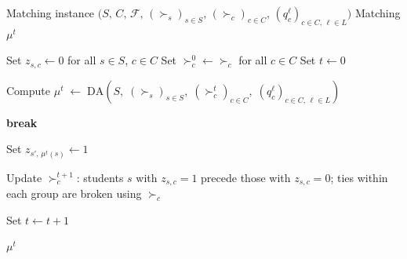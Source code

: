 \documentclass[12pt]{article}
\begin{document}
\bigskip

\begin{algorithm}[H]
    \caption{Simultaneous}
    \label{alg:simultaneous}
    \begin{algorithmic}[1]
        \REQUIRE Matching instance
        $\bigl(S,\,C,\,\mathcal{F},\,(\succ_s)_{s\in S},\,(\succ_c)_{c\in C},\,(q_c^\ell)_{c\in C,\,\ell\in L}\bigr)$
        \ENSURE Matching $\mu^t$

        \STATE Set $z_{s,c} \leftarrow 0$ for all $s\in S$, $c\in C$
        \STATE Set $\succ_c^{0} \leftarrow \succ_c$ for all $c\in C$
        \STATE Set $t \leftarrow 0$

        \LOOP

        \STATE Compute $\mu^{t} \;\leftarrow\;
            \mathrm{DA}\!\left(
            S,\;
            (\succ_s)_{s\in S},\;
            (\succ_c^{t})_{c\in C},\;
            (q_c^\ell)_{c\in C,\,\ell\in L}
            \right)$

        \STATE \textbf{break} 
        \ENDIF

        \STATE Set $z_{s',\,\mu^{t}(s)} \leftarrow 1$
        \ENDFOR
        \ENDFOR

        \STATE Update $\succ_c^{t+1}$: students $s$ with $z_{s,c}=1$ precede
        those with $z_{s,c}=0$; ties within each group are broken using
        $\succ_c$
        \ENDFOR

        \STATE Set $t \leftarrow t+1$

        \ENDLOOP

        \RETURN $\mu^{t}$

    \end{algorithmic}
\end{algorithm}

\bigskip
\end{document}
